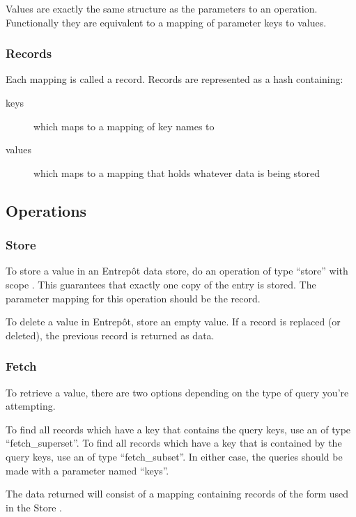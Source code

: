 Values are exactly the same structure as the parameters to an operation.  Functionally they are equivalent to a mapping of parameter keys to values.

\subsubsection{Records}

Each mapping is called a record.  Records are represented as a hash containing:

\begin{description} 
        \item[keys] which maps to a mapping of key names to \resources{}
        \item[values] which maps to a mapping that holds whatever data is being stored
\end{description}

\subsection{Operations}

\subsubsection{Store}

To store a value in an Entrep\^ot data store, do an operation of type ``store'' with scope \single{}.  This guarantees that exactly one copy of the entry is stored.  The parameter mapping for this operation should be the record.

To delete a value in Entrep\^ot, store an empty value.  If a record is replaced (or deleted), the previous record is returned as data.

\subsubsection{Fetch}

To retrieve a value, there are two options depending on the type of query you're attempting.

To find all records which have a key that contains the query keys, use an \operation{} of type ``fetch\_superset''.  To find all records which have a key that is contained by the query keys, use an \operation{} of type ``fetch\_subset''.  In either case, the queries should be made with a parameter named ``keys''.

The data returned will consist of a mapping containing records of the form used in the Store \operation{}.

